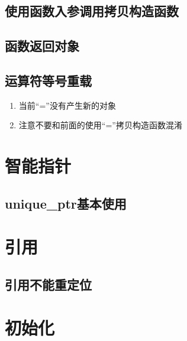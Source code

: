 \documentclass{../main.tex}{subfiles}
\begin{document}
\subsection{使用函数入参调用拷贝构造函数}


\subsection{函数返回对象}


\subsection{运算符等号重载}

\begin{enumerate}[labelindent=0pt, itemsep=0pt, parsep=0pt, topsep=0pt, partopsep=0pt]
    \item 当前``=''没有产生新的对象
    \item 注意不要和前面的使用``=''拷贝构造函数混淆
\end{enumerate}


\section{智能指针}
\subsection{unique\_ptr基本使用}



\section{引用}
\subsection{引用不能重定位}


\section{初始化}
\end{document}
